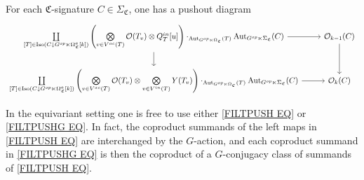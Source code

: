 \documentclass[a4paper,10pt
,draft
]{article}%
\renewcommand{\1}{\eta}%
\newcommand{\SC}{\Sigma_{\mathfrak C}}
\newcommand{\OC}{\Omega_{\mathfrak C}}
\begin{document}
\begin{proposition}
      \label{FILTPUSHG PROP}
For each $\mathfrak C$-signature $C \in \Sigma_{\mathfrak C}$, one has a pushout diagram
      \vspace{-10pt}
\begin{align}\label{FILTPUSHG EQ}
\begin{tikzcd}[ampersand replacement=\&]
	\mathop{\coprod}\limits_{[T] \in \Iso(C \downarrow G^{op} \ltimes \Omega_{\mathfrak C}^a[k])}
	\left(
		\mathop{\bigotimes}\limits_{v \in V^{ac}(T)} \O(T_v) \otimes
		Q^{in}_T[u]
	\right) \cdot_{\Aut_{G^{op} \ltimes \OC}(T)} \Aut_{G^{op} \ltimes \SC}(C)
		\arrow[r] \arrow[d]
\&
	\O_{k-1}(C) \arrow[d]
\\                  
	\mathop{\coprod}\limits_{[T] \in \Iso(C \downarrow G^{op} \ltimes \Omega_{\mathfrak C}^a[k])}
	\left(
		\mathop{\bigotimes}\limits_{v \in V^{ac}(T)} \O(T_v) \otimes
		\mathop{\bigotimes}\limits_{v \in V^{in}(T)} Y(T_v)
	\right) \cdot_{\Aut_{G^{op} \ltimes \OC}(T)} \Aut_{G^{op} \ltimes \SC}(C)
		\arrow[r]
\&
	\O_k(C)
\end{tikzcd}
\end{align}
\end{proposition}



\begin{remark} 
In the equivariant setting one is free to use either \eqref{FILTPUSH EQ} or \eqref{FILTPUSHG EQ}.
In fact, the coproduct summands of the left maps in \eqref{FILTPUSH EQ} are interchanged by the $G$-action, 
and each coproduct summand in \eqref{FILTPUSHG EQ} is then the coproduct of a $G$-conjugacy class of summands of \eqref{FILTPUSH EQ}.
%
%
\end{remark}
\end{document}
